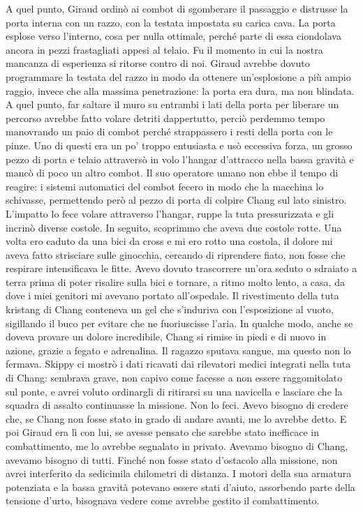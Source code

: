 A quel punto, Giraud ordinò ai combot di sgomberare il passaggio e
distrusse la porta interna con un razzo, con la testata impostata su
carica cava. La porta esplose verso l'interno, cosa per nulla ottimale,
perché parte di essa ciondolava ancora in pezzi frastagliati appesi al
telaio. Fu il momento in cui la nostra mancanza di esperienza si ritorse
contro di noi. Giraud avrebbe dovuto programmare la testata del razzo in
modo da ottenere un'esplosione a più ampio raggio, invece che alla
massima penetrazione: la porta era dura, ma non blindata. A quel punto,
far saltare il muro su entrambi i lati della porta per liberare un
percorso avrebbe fatto volare detriti dappertutto, perciò perdemmo tempo
manovrando un paio di combot perché strappassero i resti della porta con
le pinze. Uno di questi era un po' troppo entusiasta e usò eccessiva
forza, un grosso pezzo di porta e telaio attraversò in volo l'hangar
d'attracco nella bassa gravità e mancò di poco un altro combot. Il suo
operatore umano non ebbe il tempo di reagire: i sistemi automatici del
combot fecero in modo che la macchina lo schivasse, permettendo però al
pezzo di porta di colpire Chang sul lato sinistro. L'impatto lo fece
volare attraverso l'hangar, ruppe la tuta pressurizzata e gli incrinò
diverse costole. In seguito, scoprimmo che aveva due costole rotte. Una
volta ero caduto da una bici da cross e mi ero rotto una costola, il
dolore mi aveva fatto strisciare sulle ginocchia, cercando di riprendere
fiato, non fosse che respirare intensificava le fitte. Avevo dovuto
trascorrere un'ora seduto o sdraiato a terra prima di poter risalire
sulla bici e tornare, a ritmo molto lento, a casa, da dove i miei
genitori mi avevano portato all'ospedale. Il rivestimento della tuta
kristang di Chang conteneva un gel che s'induriva con l'esposizione al
vuoto, sigillando il buco per evitare che ne fuoriuscisse l'aria. In
qualche modo, anche se doveva provare un dolore incredibile, Chang si
rimise in piedi e di nuovo in azione, grazie a fegato e adrenalina. Il
ragazzo sputava sangue, ma questo non lo fermava. Skippy ci mostrò i
dati ricavati dai rilevatori medici integrati nella tuta di Chang:
sembrava grave, non capivo come facesse a non essere raggomitolato sul
ponte, e avrei voluto ordinargli di ritirarsi su una navicella e
lasciare che la squadra di assalto continuasse la missione. Non lo feci.
Avevo bisogno di credere che, se Chang non fosse stato in grado di
andare avanti, me lo avrebbe detto. E poi Giraud era lì con lui, se
avesse pensato che sarebbe stato inefficace in combattimento, me lo
avrebbe segnalato in privato. Avevamo bisogno di Chang, avevamo bisogno
di tutti. Finché non fosse stato d'ostacolo alla missione, non avrei
interferito da sedicimila chilometri di distanza. I motori della sua
armatura potenziata e la bassa gravità potevano essere stati d'aiuto,
assorbendo parte della tensione d'urto, bisognava vedere come avrebbe
gestito il combattimento.

